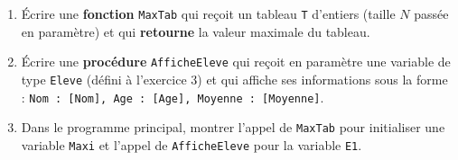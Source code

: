 \documentclass[11pt]{article}
\begin{document}
\begin{exercice}
\begin{enumerate}
    \item Écrire une \textbf{fonction} \texttt{MaxTab} qui reçoit un tableau \texttt{T} d'entiers (taille $N$ passée en paramètre) et qui \textbf{retourne} la valeur maximale du tableau.
    \item Écrire une \textbf{procédure} \texttt{AfficheEleve} qui reçoit en paramètre une variable de type \texttt{Eleve} (défini à l'exercice 3) et qui affiche ses informations sous la forme : \texttt{Nom : [Nom], Age : [Age], Moyenne : [Moyenne]}.
    \item Dans le programme principal, montrer l'appel de \texttt{MaxTab} pour initialiser une variable \texttt{Maxi} et l'appel de \texttt{AfficheEleve} pour la variable \texttt{E1}.
\end{enumerate}
\end{exercice}
\end{document}
